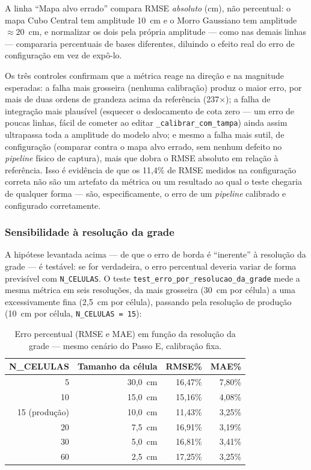 \noindent A linha ``Mapa alvo errado'' compara RMSE \emph{absoluto}
(cm), não percentual: o mapa Cubo Central tem amplitude 10~cm e o
Morro Gaussiano tem amplitude $\approx 20$~cm, e normalizar os dois
pela própria amplitude — como nas demais linhas — compararia
percentuais de bases diferentes, diluindo o efeito real do erro de
configuração em vez de expô-lo.

Os três controles confirmam que a métrica reage na direção e na
magnitude esperadas: a falha mais grosseira (nenhuma calibração)
produz o maior erro, por mais de duas ordens de grandeza acima da
referência (237$\times$);
a falha de integração mais plausível (esquecer o deslocamento de cota
zero — um erro de poucas linhas, fácil de cometer ao editar
\texttt{\_calibrar\_com\_tampa}) ainda assim ultrapassa toda a
amplitude do modelo alvo; e mesmo a falha mais sutil, de configuração
(comparar contra o mapa alvo errado, sem nenhum defeito no
\textit{pipeline} físico de captura), mais que dobra o RMSE absoluto
em relação à referência. Isso é evidência de que os 11,4\% de RMSE
medidos na configuração correta não são um artefato da métrica ou um
resultado ao qual o teste chegaria de qualquer forma — são,
especificamente, o erro de um \textit{pipeline} calibrado e configurado
corretamente.

\subsubsection{Sensibilidade à resolução da grade}
\label{subsec:sensibilidade-resolucao}

A hipótese levantada acima — de que o erro de borda é ``inerente'' à
resolução da grade — é testável: se for verdadeira, o erro percentual
deveria variar de forma previsível com \texttt{N\_CELULAS}. O teste
\texttt{test\_erro\_por\_resolucao\_da\_grade} mede a mesma métrica em
seis resoluções, da mais grosseira (30~cm por célula) a uma
excessivamente fina (2,5~cm por célula), passando pela resolução de
produção (10~cm por célula, \texttt{N\_CELULAS = 15}):

\begin{table}[!ht]
\centering
\caption{Erro percentual (RMSE e MAE) em função da resolução da grade — mesmo cenário do Passo E, calibração fixa.}
\label{tab:sensibilidade-resolucao}
\begin{tabular}{@{}rrrr@{}}
\toprule
\textbf{N\_CELULAS} & \textbf{Tamanho da célula} & \textbf{RMSE\%} & \textbf{MAE\%} \\
\midrule
5  & 30,0~cm & 16,47\% & 7,80\% \\
10 & 15,0~cm & 15,16\% & 4,08\% \\
15 (produção) & 10,0~cm & 11,43\% & 3,25\% \\
20 & 7,5~cm  & 16,91\% & 3,19\% \\
30 & 5,0~cm  & 16,81\% & 3,41\% \\
60 & 2,5~cm  & 17,25\% & 3,25\% \\
\bottomrule
\end{tabular}
\end{table}

